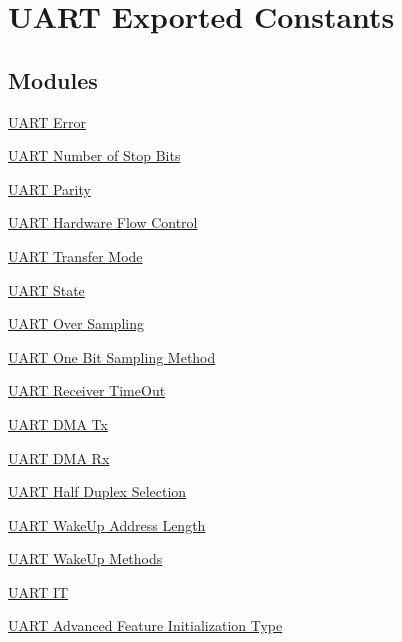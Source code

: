 \hypertarget{group___u_a_r_t___exported___constants}{}\section{U\+A\+RT Exported Constants}
\label{group___u_a_r_t___exported___constants}
\subsection*{Modules}
\begin{DoxyCompactItemize}
\item 
\hyperlink{group___u_a_r_t___error}{U\+A\+R\+T Error}
\item 
\hyperlink{group___u_a_r_t___stop___bits}{U\+A\+R\+T Number of Stop Bits}
\item 
\hyperlink{group___u_a_r_t___parity}{U\+A\+R\+T Parity}
\item 
\hyperlink{group___u_a_r_t___hardware___flow___control}{U\+A\+R\+T Hardware Flow Control}
\item 
\hyperlink{group___u_a_r_t___mode}{U\+A\+R\+T Transfer Mode}
\item 
\hyperlink{group___u_a_r_t___state}{U\+A\+R\+T State}
\item 
\hyperlink{group___u_a_r_t___over___sampling}{U\+A\+R\+T Over Sampling}
\item 
\hyperlink{group___u_a_r_t___one_bit___sampling}{U\+A\+R\+T One Bit Sampling Method}
\item 
\hyperlink{group___u_a_r_t___receiver___time_out}{U\+A\+R\+T Receiver Time\+Out}
\item 
\hyperlink{group___u_a_r_t___d_m_a___tx}{U\+A\+R\+T D\+M\+A Tx}
\item 
\hyperlink{group___u_a_r_t___d_m_a___rx}{U\+A\+R\+T D\+M\+A Rx}
\item 
\hyperlink{group___u_a_r_t___half___duplex___selection}{U\+A\+R\+T Half Duplex Selection}
\item 
\hyperlink{group___u_a_r_t___wake_up___address___length}{U\+A\+R\+T Wake\+Up Address Length}
\item 
\hyperlink{group___u_a_r_t___wake_up___methods}{U\+A\+R\+T Wake\+Up Methods}
\item 
\hyperlink{group___u_a_r_t___i_t}{U\+A\+R\+T IT}
\item 
\hyperlink{group___u_a_r_t___advanced___features___initialization___type}{U\+A\+R\+T Advanced Feature Initialization Type}
\item 

\end{DoxyCompactItemize}
